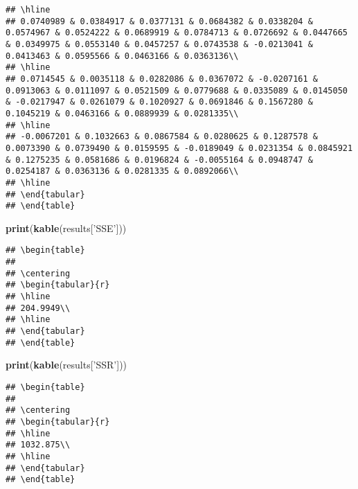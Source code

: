\documentclass[]{article}
\newenvironment{Shaded}{\begin{snugshade}}{\end{snugshade}}
\newcommand{\KeywordTok}[1]{\textcolor[rgb]{0.13,0.29,0.53}{\textbf{#1}}}
\newcommand{\StringTok}[1]{\textcolor[rgb]{0.31,0.60,0.02}{#1}}
\newcommand{\NormalTok}[1]{#1}
\begin{document}
\begin{verbatim}
## \hline
## 0.0740989 & 0.0384917 & 0.0377131 & 0.0684382 & 0.0338204 & 0.0574967 & 0.0524222 & 0.0689919 & 0.0784713 & 0.0726692 & 0.0447665 & 0.0349975 & 0.0553140 & 0.0457257 & 0.0743538 & -0.0213041 & 0.0413463 & 0.0595566 & 0.0463166 & 0.0363136\\
## \hline
## 0.0714545 & 0.0035118 & 0.0282086 & 0.0367072 & -0.0207161 & 0.0913063 & 0.0111097 & 0.0521509 & 0.0779688 & 0.0335089 & 0.0145050 & -0.0217947 & 0.0261079 & 0.1020927 & 0.0691846 & 0.1567280 & 0.1045219 & 0.0463166 & 0.0889939 & 0.0281335\\
## \hline
## -0.0067201 & 0.1032663 & 0.0867584 & 0.0280625 & 0.1287578 & 0.0073390 & 0.0739490 & 0.0159595 & -0.0189049 & 0.0231354 & 0.0845921 & 0.1275235 & 0.0581686 & 0.0196824 & -0.0055164 & 0.0948747 & 0.0254187 & 0.0363136 & 0.0281335 & 0.0892066\\
## \hline
## \end{tabular}
## \end{table}
\end{verbatim}

\begin{Shaded}
\begin{Highlighting}[]
\KeywordTok{print}\NormalTok{(}\KeywordTok{kable}\NormalTok{(results[}\StringTok{'SSE'}\NormalTok{]))}
\end{Highlighting}
\end{Shaded}

\begin{verbatim}
## \begin{table}
## 
## \centering
## \begin{tabular}{r}
## \hline
## 204.9949\\
## \hline
## \end{tabular}
## \end{table}
\end{verbatim}

\begin{Shaded}
\begin{Highlighting}[]
\KeywordTok{print}\NormalTok{(}\KeywordTok{kable}\NormalTok{(results[}\StringTok{'SSR'}\NormalTok{]))}
\end{Highlighting}
\end{Shaded}

\begin{verbatim}
## \begin{table}
## 
## \centering
## \begin{tabular}{r}
## \hline
## 1032.875\\
## \hline
## \end{tabular}
## \end{table}
\end{verbatim}
\end{document}
